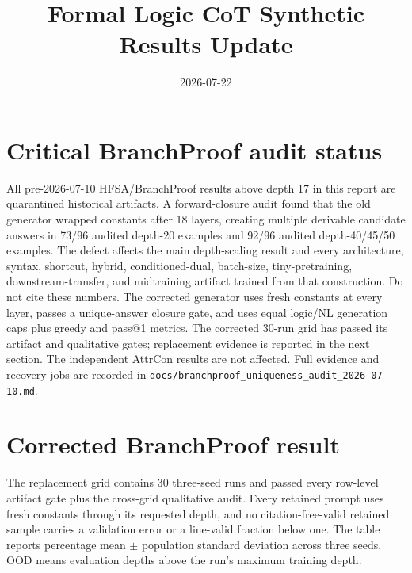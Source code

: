 \documentclass[10pt]{article}
\title{Formal Logic CoT Synthetic Results Update}
\date{2026-07-22}
\begin{document}
\maketitle

\section{Critical BranchProof audit status}
All pre-2026-07-10 HFSA/BranchProof results above depth 17 in this report are
quarantined historical artifacts. A forward-closure audit found that the old
generator wrapped constants after 18 layers, creating multiple derivable
candidate answers in 73/96 audited depth-20 examples and 92/96 audited
depth-40/45/50 examples. The defect affects the main depth-scaling result and
every architecture, syntax, shortcut, hybrid, conditioned-dual, batch-size,
tiny-pretraining, downstream-transfer, and midtraining artifact trained from
that construction. Do not cite these numbers. The corrected generator uses
fresh constants at every layer, passes a unique-answer closure gate, and uses
equal logic/NL generation caps plus greedy and pass@1 metrics.
The corrected 30-run grid has passed its artifact and qualitative gates; replacement evidence is reported in the next section. The independent AttrCon results are not affected.
Full evidence and recovery jobs are recorded in
\texttt{docs/branchproof\_uniqueness\_audit\_2026-07-10.md}.


\section{Corrected BranchProof result}
The replacement grid contains 30 three-seed runs and passed every row-level artifact gate plus
the cross-grid qualitative audit. Every retained prompt uses fresh constants through its requested
depth, and no citation-free-valid retained sample carries a validation error or a line-valid
fraction below one. The table reports percentage mean $\pm$ population standard deviation across
three seeds. OOD means evaluation depths above the run's maximum training depth.
\end{document}
